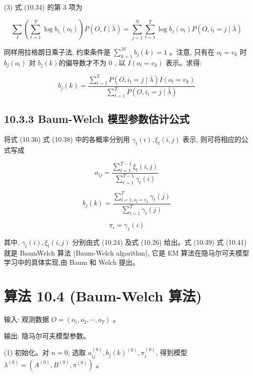 \documentclass[10pt]{article}
\begin{document}
(3) 式 (10.34) 的第 3 项为

$$
\sum_{I}\left(\sum_{t=1}^{T} \log b_{i_{t}}\left(o_{t}\right)\right) P(O, I \mid \bar{\lambda})=\sum_{j=1}^{N} \sum_{t=1}^{T} \log b_{j}\left(o_{t}\right) P\left(O, i_{t}=j \mid \bar{\lambda}\right)
$$

同样用拉格朗日乘子法, 约束条件是 $\sum_{k=1}^{M} b_{j}(k)=1$ 。注意, 只有在 $o_{t}=v_{k}$ 时 $b_{j}\left(o_{t}\right)$ 对 $b_{j}(k)$的偏导数才不为 0 , 以 $I\left(o_{t}=v_{k}\right)$ 表示。求得:


\begin{equation*}
b_{j}(k)=\frac{\sum_{t=1}^{T} P\left(O, i_{t}=j \mid \bar{\lambda}\right) I\left(o_{t}=v_{k}\right)}{\sum_{t=1}^{T} P\left(O, i_{t}=j \mid \bar{\lambda}\right)} \tag{10.38}
\end{equation*}


\subsection*{10.3.3 Baum-Welch 模型参数估计公式}
将式 (10.36) 式 (10.38) 中的各概率分别用 $\gamma_{t}(i), \xi_{t}(i, j)$ 表示, 则可将相应的公式写成


\begin{equation*}
a_{i j}=\frac{\sum_{t=1}^{T-1} \xi_{t}(i, j)}{\sum_{t=1}^{T-1} \gamma_{t}(i)} \tag{10.39}
\end{equation*}



\begin{equation*}
b_{j}(k)=\frac{\sum_{t=1, o_{t}=v_{k}}^{T} \gamma_{t}(j)}{\sum_{t=1}^{T} \gamma_{t}(j)} \tag{10.40}
\end{equation*}


$$
\pi_{i}=\gamma_{1}(i)
$$

其中, $\gamma_{t}(i), \xi_{t}(i, j)$ 分别由式 (10.24) 及式 (10.26) 给出。式 (10.39) 式 (10.41) 就是 BaumWelch 算法 (Baum-Welch algorithm), 它是 EM 算法在隐马尔可夫模型学习中的具体实现,由 Baum 和 Welch 提出。

\section*{算法 10.4 (Baum-Welch 算法)}
输入: 观测数据 $O=\left(o_{1}, o_{2}, \cdots, o_{T}\right)$ 。

输出: 隐马尔可夫模型参数。

(1) 初始化。对 $n=0$, 选取 $a_{i j}^{(0)}, b_{j}(k)^{(0)}, \pi_{i}^{(0)}$, 得到模型 $\lambda^{(0)}=\left(A^{(0)}, B^{(0)}, \pi^{(0)}\right)$ 。
\end{document}

